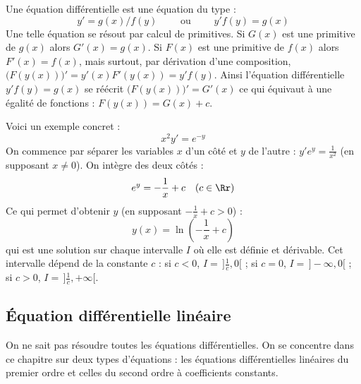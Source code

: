 \documentclass[class=report,crop=false]{standalone}
\begin{document}
\begin{exemple}
Une équation différentielle 
est une équation
du type :
$$y'=g(x)/f(y) \qquad \text{ ou } \qquad y'f(y)=g(x)$$
Une telle équation se résout par calcul de primitives.
Si $G(x)$ est une primitive de $g(x)$ alors $G'(x)=g(x)$.
Si $F(x)$ est une primitive de $f(x)$ alors
$F'(x)=f(x)$, mais surtout, par dérivation d'une composition,
$\big(F(y(x))\big)' = y'(x) F'(y(x)) = y' f(y)$.
Ainsi l'équation différentielle $y'f(y)=g(x)$
se réécrit $\big(F(y(x))\big)' = G'(x)$
ce qui équivaut à une égalité de fonctions :
$F(y(x))=G(x)+c$.

\bigskip

Voici un exemple concret :
$$x^2y' = e^{-y}$$
On commence par séparer les variables $x$ d'un côté et $y$ de l'autre :
$y'e^{y} = \frac{1}{x^2}$  (en supposant $x\neq 0$).
On intègre des deux côtés :
$$e^{y} = -\frac{1}{x}+c \quad (c\in\Rr)$$
Ce qui permet d'obtenir $y$ (en supposant $-\frac{1}{x}+c>0$) :
$$y(x) = \ln\left(-\frac{1}{x}+c\right)$$
qui est une solution sur chaque intervalle $I$ où elle est définie et dérivable.
Cet intervalle dépend de la constante $c$ :
si $c<0$, $I=\,]\frac1c,0[$ ;
si $c=0$, $I=\,]-\infty,0[$ ; si $c>0$, $I=\,]\frac1c,+\infty[$.

\end{exemple}




\subsection{Équation différentielle linéaire}

On ne sait pas résoudre toutes les équations différentielles.
On se concentre dans ce chapitre sur deux types d'équations : les équations différentielles
linéaires du premier ordre et celles du second ordre à coefficients constants.
\end{document}
